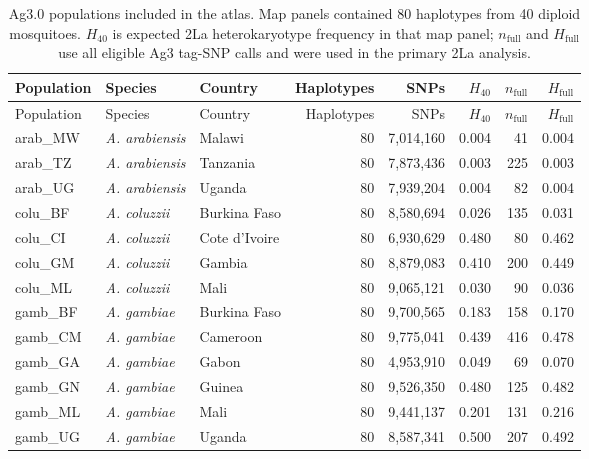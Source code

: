 \begin{longtable}{@{}lllrrrrr@{}}
\caption{Ag3.0 populations included in the atlas. Map panels contained 80 haplotypes from 40 diploid mosquitoes. $H_{40}$ is expected 2La heterokaryotype frequency in that map panel; $n_{\mathrm{full}}$ and $H_{\mathrm{full}}$ use all eligible Ag3 tag-SNP calls and were used in the primary 2La analysis.}\label{tab:cohorts}\\
\toprule Population & Species & Country & Haplotypes & SNPs & $H_{40}$ & $n_{\mathrm{full}}$ & $H_{\mathrm{full}}$ \\
\midrule\endfirsthead
\toprule Population & Species & Country & Haplotypes & SNPs & $H_{40}$ & $n_{\mathrm{full}}$ & $H_{\mathrm{full}}$ \\
\midrule\endhead
arab\_MW & \textit{A. arabiensis} & Malawi & 80 & 7,014,160 & 0.004 & 41 & 0.004 \\
arab\_TZ & \textit{A. arabiensis} & Tanzania & 80 & 7,873,436 & 0.003 & 225 & 0.003 \\
arab\_UG & \textit{A. arabiensis} & Uganda & 80 & 7,939,204 & 0.004 & 82 & 0.004 \\
colu\_BF & \textit{A. coluzzii} & Burkina Faso & 80 & 8,580,694 & 0.026 & 135 & 0.031 \\
colu\_CI & \textit{A. coluzzii} & Cote d'Ivoire & 80 & 6,930,629 & 0.480 & 80 & 0.462 \\
colu\_GM & \textit{A. coluzzii} & Gambia & 80 & 8,879,083 & 0.410 & 200 & 0.449 \\
colu\_ML & \textit{A. coluzzii} & Mali & 80 & 9,065,121 & 0.030 & 90 & 0.036 \\
gamb\_BF & \textit{A. gambiae} & Burkina Faso & 80 & 9,700,565 & 0.183 & 158 & 0.170 \\
gamb\_CM & \textit{A. gambiae} & Cameroon & 80 & 9,775,041 & 0.439 & 416 & 0.478 \\
gamb\_GA & \textit{A. gambiae} & Gabon & 80 & 4,953,910 & 0.049 & 69 & 0.070 \\
gamb\_GN & \textit{A. gambiae} & Guinea & 80 & 9,526,350 & 0.480 & 125 & 0.482 \\
gamb\_ML & \textit{A. gambiae} & Mali & 80 & 9,441,137 & 0.201 & 131 & 0.216 \\
gamb\_UG & \textit{A. gambiae} & Uganda & 80 & 8,587,341 & 0.500 & 207 & 0.492 \\
\bottomrule
\end{longtable}
